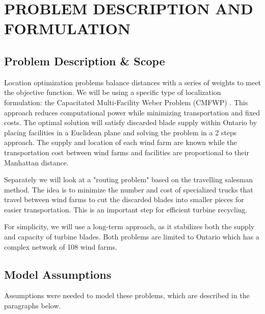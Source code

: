 \section{PROBLEM DESCRIPTION AND FORMULATION}
\label{section:problem_desc}




\subsection{Problem Description \& Scope}
Location optimization problems balance distances with a series of weights to meet the objective function. We will be using a specific type of localization formulation: the Capacitated Multi-Facility Weber Problem (CMFWP) \cite{RN4}. This approach reduces computational power while minimizing transportation and fixed costs. The optimal solution will satisfy discarded blade supply within Ontario by placing facilities in a Euclidean plane and solving the problem in a 2 steps approach. The supply and location of each wind farm are known while the transportation cost between wind farms and facilities are proportional to their Manhattan distance. 

Separately we will look at a "routing problem" based on the travelling salesman method. The idea is to minimize the number and cost of specialized trucks that travel between wind farms to cut the discarded blades into smaller pieces for easier transportation. This is an important step for efficient turbine recycling. 

For simplicity, we will use a long-term approach, as it stabilizes both the supply and capacity of turbine blades. Both problems are limited to Ontario which has a complex network of 108 wind farms. 


\subsection{Model Assumptions}
Assumptions were needed to model these problems, which are described in the paragraphs below. 

